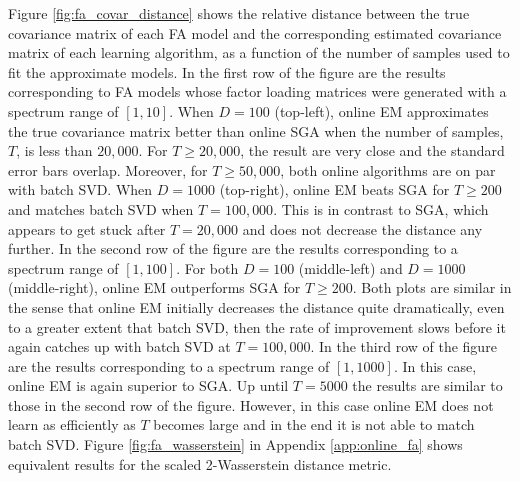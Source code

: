 \documentclass[msc,deptreport.inf]{infthesis} %
\begin{document}
Figure \ref{fig:fa_covar_distance} shows the relative distance between the true covariance matrix of each FA model and the corresponding estimated covariance matrix of each learning algorithm, as a function of the number of samples used to fit the approximate models. 
In the first row of the figure are the results corresponding to FA models whose factor loading matrices were generated with a spectrum range of $[1, 10]$. When $D=100$ (top-left), online EM approximates the true covariance matrix better than online SGA when the number of samples, $T$, is less than $20,000$. For $T \geq 20,000$, the result are very close and the standard error bars overlap. Moreover, for $T \geq 50,000$, both online algorithms are on par with batch SVD. When $D=1000$ (top-right), online EM beats SGA for $T \geq 200$ and matches batch SVD when $T=100,000$. This is in contrast to SGA, which appears to get stuck after $T=20,000$ and does not decrease the distance any further. In the second row of the figure are the results corresponding to a spectrum range of $[1, 100]$. For both $D=100$ (middle-left) and $D=1000$ (middle-right), online EM outperforms SGA for $T \geq 200$. Both plots are similar in the sense that online EM initially decreases the distance quite dramatically, even to a greater extent that batch SVD, then the rate of improvement slows before it again catches up with batch SVD at $T=100,000$. In the third row of the figure are the results corresponding to a spectrum range of $[1, 1000]$. In this case, online EM is again superior to SGA. Up until $T=5000$ the results are similar to those in the second row of the figure. However, in this case online EM does not learn as efficiently as $T$ becomes large and in the end it is not able to match batch SVD. Figure \ref{fig:fa_wasserstein} in Appendix \ref{app:online_fa} shows equivalent results for the scaled 2-Wasserstein distance metric. 
\end{document}
